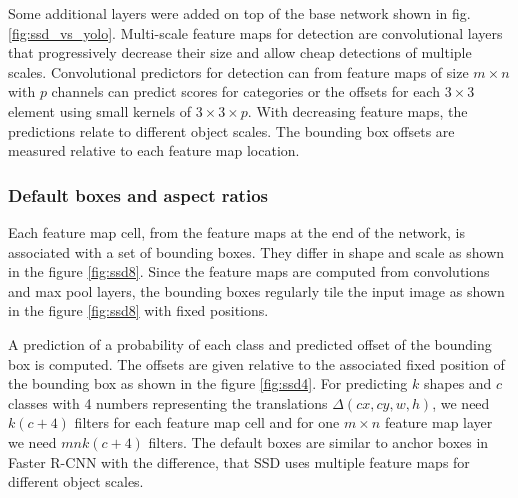 \documentclass[a4paper,11pt,titlepage,twoside]{article}
\numberwithin{figure}{section}
\begin{document}
Some additional layers were added on top of the base network shown in fig. \ref{fig:ssd_vs_yolo}. Multi-scale feature maps for detection are convolutional layers that progressively decrease their size and allow cheap detections of multiple scales. Convolutional predictors for detection can from feature maps of size $m \times n$ with $p$ channels can predict scores for categories or the offsets for each $3 \times 3$ element  using small kernels of $3 \times 3 \times p$. With decreasing feature maps, the predictions relate to different object scales. The bounding box offsets are measured relative to each feature map location. 

\subsubsection{Default boxes and aspect ratios}
Each feature map cell, from the feature maps at the end of the network, is associated with a set of bounding boxes. They differ in shape and scale as shown in the figure \ref{fig:ssd8}. Since the feature maps are computed from convolutions and max pool layers, the bounding boxes regularly tile the input image as shown in the figure \ref{fig:ssd8} with fixed positions.

A prediction of a probability of each class and predicted offset of the bounding box is computed. The offsets are given relative to the associated fixed position of the bounding box as shown in the figure \ref{fig:ssd4}. For predicting $k$ shapes and $c$ classes with 4 numbers representing the translations $\Delta(cx, cy, w, h)$, we need $k(c+4)$ filters for each feature map cell and for one $m \times n$ feature map layer we need $mnk(c+4)$ filters. The default boxes are similar to anchor boxes in Faster R-CNN with the difference, that SSD uses multiple feature maps for different object scales. 
\end{document}
